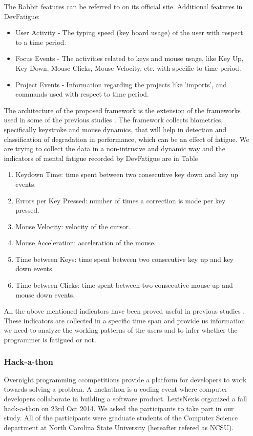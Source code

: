 \documentclass{acm_proc_article-sp}
\begin{document}
The Rabbit features can be referred to on its official
site\footnotemark[\ref{rabbitNote}] .
Additional features in DevFatigue:
\begin{itemize}
	\item User Activity - The typing speed (key board usage) of the user with
	respect to a time period.
	\item Focus Events - The activities related to keys and mouse usage, like Key
	Up, Key Down, Mouse Clicks, Mouse Velocity, etc. with specific to time period.
	\item Project Events - Information regarding the projects like 'imports', and
	commands used with respect to time period.
\end{itemize}
The architecture of the proposed framework is the extension of the frameworks
used in some of the previous studies \cite{pimenta:analysis}. The framework
collects biometrics, specifically keystroke and mouse dynamics, that will
help in detection and classification of degradation in performance, which can
be an effect of fatigue. We are trying to collect the data in a non-intrusive
and dynamic way and the indicators of mental fatigue recorded by DevFatigue are
in Table 
  	\begin{enumerate}
   		\item Keydown Time: time spent between two consecutive key down and key up
   		events.
   		\item Errors per Key Pressed: number of times a correction is made per key
   		pressed.
   		\item Mouse Velocity: velocity of the cursor.
   		\item Mouse Acceleration: acceleration of the mouse.
   		\item Time between Keys: time spent between two consecutive key up and key
   		down events.
   		\item Time between Clicks: time spent between two consecutive mouse up and
   		mouse down events.
    \end{enumerate}
All the above mentioned indicators have been proved useful in previous studies
\cite{pimenta:monitor} \cite{pimenta:analysis}. These indicators are
collected in a specific time span and provide us information we need to analyze
the working patterns of the users and to infer whether the programmer is
fatigued or not.

\subsubsection{Hack-a-thon}
Overnight programming ccompetitions provide a platform for developers to work
towards solving a problem. A hackathon is a coding event where computer
developers collaborate in building a software product. LexisNexis organized a
fall hack-a-thon on 23rd Oct 2014. We asked the participants to take part in our
study. All of the participants were graduate students of the Computer Science
department at North Carolina State University (hereafter refered as NCSU).
\end{document}
